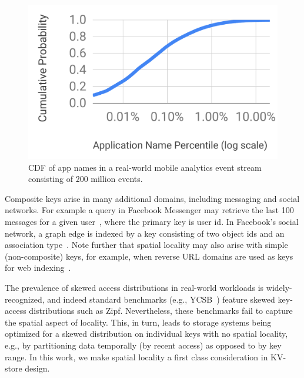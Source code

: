 \begin{figure}[tb]
\centering
\includegraphics[width=0.75\columnwidth]{figs/cdf.pdf}
\caption{CDF of app names in a real-world mobile analytics event stream consisting of 200 million events.}
\label{fig:cdf}
\end{figure}

Composite keys arise in many additional domains, including messaging and social networks. 
For example a query in Facebook Messenger may retrieve the last 100 messages for a 
given user~\cite{Borthakur:2011:AHG:1989323.1989438}, where the primary key is user id. 
In Facebook's social network, a graph edge is indexed by a key consisting of two 
object ids and an association type~\cite{Armstrong:2013:LDB:2463676.2465296}.
Note further that spatial locality may also arise with simple (non-composite) keys, for example, when 
reverse  URL domains are used as keys for web  indexing~\cite{Cho:1998:ECT:297805.297835}. 

The prevalence of skewed  access distributions in real-world workloads is widely-recognized, 
and indeed standard benchmarks (e.g., YCSB~\cite{YCSB})  feature skewed key-access distributions such as Zipf.
Nevertheless, 
these benchmarks fail to capture the spatial aspect of locality.
This, in turn, leads to storage systems being optimized for a skewed distribution on individual keys with no spatial locality,
e.g., by partitioning data temporally (by recent access) as opposed to by key range.
In this work, we make spatial locality a first class consideration in KV-store design.

